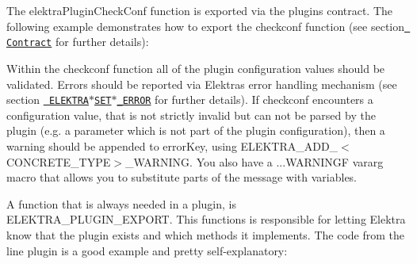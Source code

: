 The {\ttfamily elektra\+Plugin\+Check\+Conf} function is exported via the plugin\textquotesingle{}s contract. The following example demonstrates how to export the {\ttfamily checkconf} function (see section \href{\#contract}{\texttt{ Contract}} for further details)\+:


\begin{DoxyCode}{0}
\end{DoxyCode}


Within the {\ttfamily checkconf} function all of the plugin configuration values should be validated. Errors should be reported via Elektra\textquotesingle{}s error handling mechanism (see section \href{\#elektra_set_concrete_error}{\texttt{ E\+L\+E\+K\+T\+R\+A$\ast$\+S\+E\+T$\ast$\+\_\+\+E\+R\+R\+OR}} for further details). If {\ttfamily checkconf} encounters a configuration value, that is not strictly invalid but can not be parsed by the plugin (e.\+g. a parameter which is not part of the plugin configuration), then a warning should be appended to {\ttfamily error\+Key}, using {\ttfamily E\+L\+E\+K\+T\+R\+A\+\_\+\+A\+D\+D\+\_\+$<$C\+O\+N\+C\+R\+E\+T\+E\+\_\+\+T\+Y\+PE$>$\+\_\+\+W\+A\+R\+N\+I\+NG}. You also have a {\ttfamily ...W\+A\+R\+N\+I\+N\+GF} vararg macro that allows you to substitute parts of the message with variables.

A function that is always needed in a plugin, is {\ttfamily E\+L\+E\+K\+T\+R\+A\+\_\+\+P\+L\+U\+G\+I\+N\+\_\+\+E\+X\+P\+O\+RT}. This functions is responsible for letting Elektra know that the plugin exists and which methods it implements. The code from the line plugin is a good example and pretty self-\/explanatory\+:


\begin{DoxyCode}{0}
\DoxyCodeLine{\{}
\DoxyCodeLine{\}}
\end{DoxyCode}


